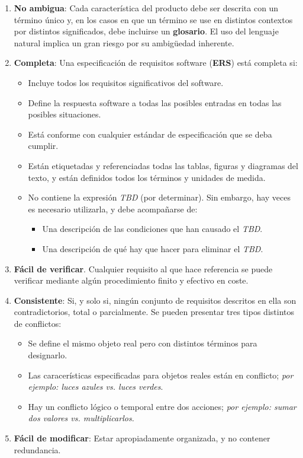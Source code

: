 \begin{enumerate}
    \item \textbf{No ambigua}: Cada característica del producto debe ser descrita con un término único y, en los casos en que un término se use en distintos contextos por distintos significados, debe incluirse un \textbf{glosario}. El uso del lenguaje natural implica un gran riesgo por su ambigüedad inherente.
    \item \textbf{Completa}: Una especificación de requisitos software (\textbf{ERS}) está completa si:
          \begin{itemize}
              \item Incluye todos los requisitos significativos del software.
              \item Define la respuesta software a todas las posibles entradas en todas las posibles situaciones.
              \item Está conforme con cualquier estándar de especificación que se deba cumplir.
              \item Están etiquetadas y referenciadas todas las tablas, figuras y diagramas del texto, y están definidos todos los términos y unidades de medida.
              \item No contiene la expresión \textit{TBD} (por determinar). Sin embargo, hay veces es necesario utilizarla, y debe acompañarse de:
                    \begin{itemize}
                        \item Una descripción de las condiciones que han causado el \textit{TBD}.
                        \item Una descripción de qué hay que hacer para eliminar el \textit{TBD}.
                    \end{itemize}
          \end{itemize}
    \item \textbf{Fácil de verificar}. Cualquier requisito al que hace referencia se puede verificar mediante algún procedimiento finito y efectivo en coste.
    \item \textbf{Consistente}: Si, y solo si, ningún conjunto de requisitos descritos en ella son contradictorios, total o parcialmente. Se pueden presentar tres tipos distintos de conflictos:
        \begin{itemize}
            \item Se define el mismo objeto real pero con distintos términos para designarlo.
            \item Las caracerísticas especificadas para objetos reales están en conflicto; \textit{por ejemplo: luces azules vs. luces verdes}.
            \item Hay un conflicto lógico o temporal entre dos acciones; \textit{por ejemplo: sumar dos valores vs. multiplicarlos.}
        \end{itemize}
    \item \textbf{Fácil de modificar}: Estar apropiadamente organizada, y no contener redundancia.
    

\end{enumerate}
